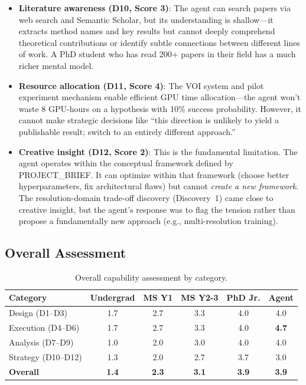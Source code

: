 \documentclass[11pt,a4paper]{article}
\begin{document}
\begin{itemize}[nosep]
\item \textbf{Literature awareness (D10, Score 3)}: The agent can search papers via web search and Semantic Scholar, but its understanding is shallow---it extracts method names and key results but cannot deeply comprehend theoretical contributions or identify subtle connections between different lines of work.
A PhD student who has read 200+ papers in their field has a much richer mental model.

\item \textbf{Resource allocation (D11, Score 4)}: The VOI system and pilot experiment mechanism enable efficient GPU time allocation---the agent won't waste 8 GPU-hours on a hypothesis with 10\% success probability.
However, it cannot make strategic decisions like ``this direction is unlikely to yield a publishable result; switch to an entirely different approach.''

\item \textbf{Creative insight (D12, Score 2)}: This is the fundamental limitation.
The agent operates within the conceptual framework defined by PROJECT\_BRIEF.
It can optimize within that framework (choose better hyperparameters, fix architectural flaws) but cannot \emph{create a new framework}.
The resolution-domain trade-off discovery (Discovery~1) came close to creative insight, but the agent's response was to flag the tension rather than propose a fundamentally new approach (e.g., multi-resolution training).
\end{itemize}

\subsection{Overall Assessment}

\begin{table}[h]
\centering
\caption{Overall capability assessment by category.}
\label{tab:overall}
\begin{tabular}{l c c c c c}
\toprule
\textbf{Category} & \textbf{Undergrad} & \textbf{MS Y1} & \textbf{MS Y2-3} & \textbf{PhD Jr.} & \textbf{Agent} \\
\midrule
Design (D1--D3) & 1.7 & 2.7 & 3.3 & 4.0 & 4.0 \\
Execution (D4--D6) & 1.7 & 2.7 & 3.3 & 4.0 & \textbf{4.7} \\
Analysis (D7--D9) & 1.0 & 2.0 & 3.0 & 4.0 & 4.0 \\
Strategy (D10--D12) & 1.3 & 2.0 & 2.7 & 3.7 & 3.0 \\
\midrule
\textbf{Overall} & \textbf{1.4} & \textbf{2.3} & \textbf{3.1} & \textbf{3.9} & \textbf{3.9} \\
\bottomrule
\end{tabular}
\end{table}
\end{document}
